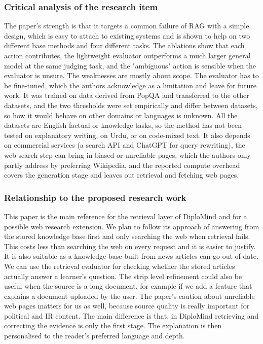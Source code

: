 \documentclass{FastFyp}
\begin{document}
\subsubsection{Critical analysis of the research item}
The paper's strength is that it targets a common failure of RAG with a simple design, which is easy to attach to existing systems and is shown to help on two different base methods and four different tasks. The ablations show that each action contributes, the lightweight evaluator outperforms a much larger general model at the same judging task, and the "ambiguous" action is  sensible when the evaluator is unsure. The weaknesses are mostly about scope. The evaluator has to be fine-tuned, which the authors acknowledge as a limitation and leave for future work. It was trained on data derived from PopQA and transferred to the other datasets, and the two thresholds were set empirically and differ between datasets, so how it would behave on other domains or languages is unknown. All the datasets are English factual or knowledge tasks, so the method has not been tested on explanatory writing, on Urdu, or on code-mixed text. It also depends on commercial services (a search API and ChatGPT for query rewriting), the web search step can bring in biased or unreliable pages, which the authors only partly address by preferring Wikipedia, and the reported compute overhead covers the generation stage and leaves out retrieval and fetching web pages.

\subsubsection{Relationship to the proposed research work}
This paper is the main reference for the retrieval layer of DiploMind and for a possible web research extension. We plan to follow its approach of answering from the stored knowledge base first and only searching the web when retrieval fails. This costs less than searching the web on every request and it is easier to justify. It is also suitable as a knowledge base built from news articles can go out of date. We can use the retrieval evaluator for checking whether the stored articles actually answer a learner’s question. The strip level refinement could also be useful when the source is a long document, for example if we add a feature that explains a document uploaded by the user. The paper’s caution about unreliable web pages matters for us as well, because source quality is really important for political and IR content. The main difference is that, in DiploMind retrieving and correcting the evidence is only the first stage. The explanation is then personalised to the reader’s preferred language and depth.
\end{document}
